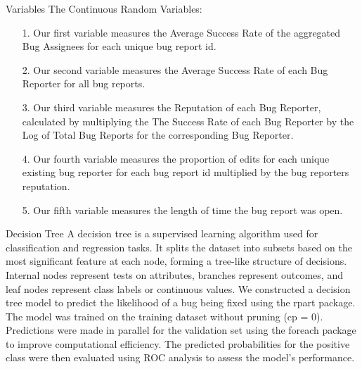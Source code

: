 \documentclass[10pt]{beamer}
\begin{document}
\begin{frame}[t]{Variables} \justifying \vspace{25pt}
	The Continuous Random Variables:
	\begin{enumerate}
	\item [1.]	Our first variable measures the Average Success Rate of the aggregated Bug Assignees for each unique bug report id.
	\item [2.]	Our second variable measures the Average Success Rate of each Bug Reporter for all bug reports.
	\item [3.]	Our third variable measures the Reputation of each Bug Reporter, calculated by multiplying the The Success Rate of each Bug Reporter by the Log of Total Bug Reports for the corresponding Bug Reporter.
	\item [4.]	Our fourth variable measures the proportion of edits for each unique existing bug reporter for each bug report id multiplied by the bug reporters reputation.
	\item [5.]	Our fifth variable measures the length of time the bug report was open. 
	\end{enumerate}
\end{frame}


\begin{frame}[t]{Decision Tree}\justifying \vspace{10pt}
	A decision tree is a supervised learning algorithm used for classification and regression tasks. It splits the dataset into subsets based on the most significant feature at each node, forming a tree-like structure of decisions. Internal nodes represent tests on attributes, branches represent outcomes, and leaf nodes represent class labels or continuous values. 
	\vskip 8pt
	We constructed a decision tree model to predict the likelihood of a bug being fixed using the rpart package. The model was trained on the training dataset without pruning (cp = 0). Predictions were made in parallel for the validation set using the foreach package to improve computational efficiency. The predicted probabilities for the positive class were then evaluated using ROC analysis to assess the model's performance.
\end{frame}
\end{document}
